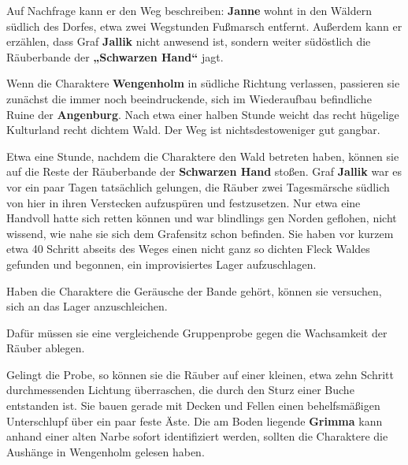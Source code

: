 Auf Nachfrage kann er den Weg beschreiben: \textbf{Janne} wohnt in den Wäldern südlich des Dorfes, etwa zwei Wegstunden Fußmarsch entfernt.
Außerdem kann er erzählen, dass Graf \textbf{Jallik} nicht anwesend ist, sondern weiter südöstlich die Räuberbande der \textbf{„Schwarzen Hand“} jagt.

\neuespalte


Wenn die Charaktere \textbf{Wengenholm} in südliche Richtung verlassen, passieren sie zunächst die immer noch beeindruckende, sich im Wiederaufbau befindliche Ruine der \textbf{Angenburg}.
Nach etwa einer halben Stunde weicht das recht hügelige Kulturland recht dichtem Wald.
Der Weg ist nichtsdestoweniger gut gangbar.

Etwa eine Stunde, nachdem die Charaktere den Wald betreten haben, können sie auf die Reste der Räuberbande der \textbf{Schwarzen Hand} stoßen.
Graf \textbf{Jallik} war es vor ein paar Tagen tatsächlich gelungen, die Räuber zwei Tagesmärsche südlich von hier in ihren Verstecken aufzuspüren und festzusetzen.
Nur etwa eine Handvoll hatte sich retten können und war blindlings gen Norden geflohen, nicht wissend, wie nahe sie sich dem Grafensitz schon befinden.
Sie haben vor kurzem etwa 40 Schritt abseits des Weges einen nicht ganz so dichten Fleck Waldes gefunden und begonnen, ein improvisiertes Lager aufzuschlagen.



Haben die Charaktere die Geräusche der Bande gehört, können sie versuchen, sich an das Lager anzuschleichen. 

{
Dafür müssen sie eine vergleichende Gruppenprobe %
gegen die Wachsamkeit  der Räuber %
ablegen.
}


Gelingt die Probe, so können sie die Räuber auf einer kleinen, etwa zehn Schritt durchmessenden Lichtung überraschen, die durch den Sturz einer Buche entstanden ist. Sie bauen gerade mit Decken und Fellen einen behelfsmäßigen Unterschlupf über ein paar feste Äste. Die am Boden liegende \textbf{Grimma} kann anhand einer alten Narbe sofort identifiziert werden, sollten die Charaktere die Aushänge in Wengenholm gelesen haben.

